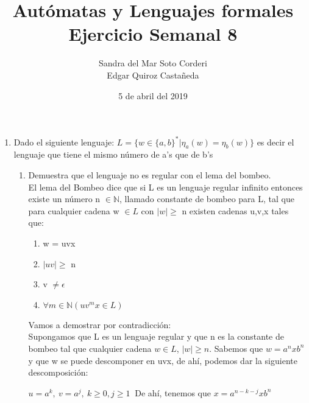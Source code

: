 \documentclass{article}
\begin{document}
    \title{
        Autómatas y Lenguajes formales \\
        Ejercicio Semanal 8
    }

    \author{
        Sandra del Mar Soto Corderi \\
        Edgar Quiroz Castañeda
    }

    \date{
        5 de abril del 2019
    }
    
    \maketitle

    \begin{enumerate}
        \item {
        Dado el siguiente lenguaje: $L = \{w \in \{a,b\}^* | \eta_a(w) = \eta_b(w) \}$ es decir el lenguaje que tiene el mismo número de a's que de b's
        \begin{enumerate}
        	\item {
        	Demuestra que el lenguaje no es regular con el lema del bombeo.\\
        	
        	El lema del Bombeo dice que si L es un lenguaje regular infinito entonces existe un número n $\in \mathbb{N}$, llamado constante de bombeo para L, tal que para cualquier cadena w $\in L$ con $|w| \geq$ n existen cadenas u,v,x tales que:        	
        	\begin{enumerate}
        		\item {
        		w = uvx
        		}
        		\item {
        		$|uv| \geq$ n
        		}
       		 	\item {
        		v $\neq \epsilon$
        		}
    			\item {
    			$\forall m \in \mathbb{N} (uv^mx \in L)$
    			}
        	\end{enumerate}
        	
        	Vamos a demostrar por contradicción:\\
        	
        	Supongamos que L es un lenguaje regular y que n es la constante de bombeo tal que cualquier cadena $w \in L$, $|w| \geq n$. Sabemos que $w = a^nxb^n$ y que w se puede descomponer en uvx, de ahí, podemos dar la siguiente descomposición:
        	
        	$u = a^k, \ v= a^j, \  k \geq 0, j \geq 1 \ $ 
        	De ahí, tenemos que $x = a^{n-k-j}xb^n$\\
        	
}
\end{enumerate}}
\end{enumerate}
\end{document}
